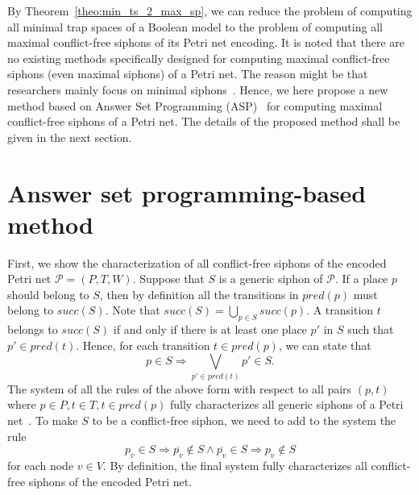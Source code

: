 \documentclass[runningheads]{llncs}
\begin{document}
By Theorem~\ref{theo:min_ts_2_max_sp}, we can reduce the problem of computing all minimal trap spaces of a Boolean model to the problem of computing all maximal conflict-free siphons of its Petri net encoding. It is noted that there are no existing methods specifically designed for computing maximal conflict-free siphons (even maximal siphons) of a Petri net. The reason might be that researchers mainly focus on minimal siphons~\cite{DBLP:journals/isci/LiuB16}. Hence, we here propose a new method based on Answer Set Programming (ASP)~\cite{DBLP:journals/aicom/GebserKKOSS11} for computing maximal conflict-free siphons of a Petri net. The details of the proposed method shall be given in the next section.

\section{Answer set programming-based method}
First, we show the characterization of all conflict-free siphons of the encoded Petri net \(\mathcal{P} = (P, T, W)\). Suppose that \(S\) is a generic siphon of \(\mathcal{P}\). If a place \(p\) should belong to \(S\), then by definition all the transitions in \(pred(p)\) must belong to \(succ(S)\). Note that \(succ(S) = \bigcup_{p \in S}succ(p)\). A transition \(t\) belongs to \(succ(S)\) if and only if there is at least one place \(p'\) in \(S\) such that \(p' \in pred(t)\). Hence, for each transition \(t \in pred(p)\), we can state that
\begin{equation}
\label{eq:siphon}
p \in S \Rightarrow \bigvee_{p' \in pred(t)}p' \in S.
\end{equation}The system of all the rules of the above form with respect to all pairs \((p, t)\) where \(p \in P, t \in T, t \in pred(p)\) fully characterizes all generic siphons of a Petri net~\cite{nabli2016enumerating}.
To make \(S\) to be a conflict-free siphon, we need to add to the system the rule
\begin{equation}
\label{eq:conflict}
p_v \in S \Rightarrow \overline{p_v} \not \in S \wedge \overline{p_v} \in S \Rightarrow p_v \not \in S
\end{equation}for each node \(v \in V\).
By definition, the final system fully characterizes all conflict-free siphons of the encoded Petri net.
\end{document}
